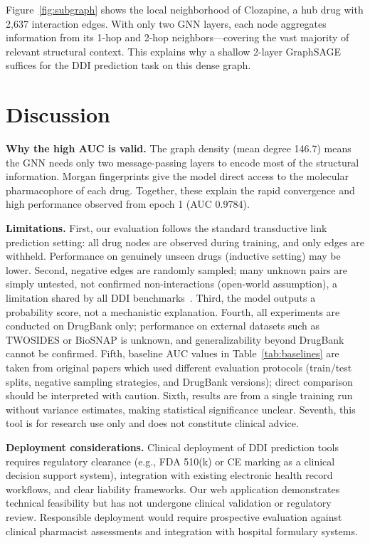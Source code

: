 \documentclass[10pt,twocolumn]{article}
\begin{document}
Figure~\ref{fig:subgraph} shows the local neighborhood of Clozapine, a hub drug
with 2,637 interaction edges. With only two GNN layers, each node aggregates
information from its 1-hop and 2-hop neighbors---covering the vast majority of
relevant structural context. This explains why a shallow 2-layer GraphSAGE
suffices for the DDI prediction task on this dense graph.

\section{Discussion}

\textbf{Why the high AUC is valid.} The graph density (mean degree 146.7) means
the GNN needs only two message-passing layers to encode most of the structural
information. Morgan fingerprints give the model direct access to the molecular
pharmacophore of each drug. Together, these explain the rapid convergence and
high performance observed from epoch 1 (AUC 0.9784).

\textbf{Limitations.} First, our evaluation follows the standard transductive
link prediction setting: all drug nodes are observed during training, and only
edges are withheld. Performance on genuinely unseen drugs (inductive setting)
may be lower. Second, negative edges are randomly sampled; many unknown pairs
are simply untested, not confirmed non-interactions (open-world assumption), a
limitation shared by all DDI benchmarks~\cite{ren2023}. Third, the model outputs
a probability score, not a mechanistic explanation. Fourth, all experiments are
conducted on DrugBank only; performance on external datasets such as TWOSIDES
or BioSNAP is unknown, and generalizability beyond DrugBank cannot be confirmed.
Fifth, baseline AUC values in Table~\ref{tab:baselines} are taken from original
papers which used different evaluation protocols (train/test splits, negative
sampling strategies, and DrugBank versions); direct comparison should be
interpreted with caution. Sixth, results are from a single training run without
variance estimates, making statistical significance unclear. Seventh, this tool
is for research use only and does not constitute clinical advice.

\textbf{Deployment considerations.} Clinical deployment of DDI prediction tools
requires regulatory clearance (e.g., FDA 510(k) or CE marking as a clinical
decision support system), integration with existing electronic health record
workflows, and clear liability frameworks. Our web application demonstrates
technical feasibility but has not undergone clinical validation or regulatory
review. Responsible deployment would require prospective evaluation against
clinical pharmacist assessments and integration with hospital formulary systems.
\end{document}
